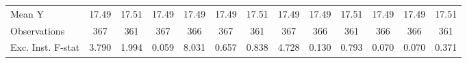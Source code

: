 {\begin{tabular}{l*{12}{c}}
\midrule
Mean Y      &       17.49         &       17.51         &       17.49         &       17.49         &       17.49         &       17.51         &       17.49         &       17.49         &       17.51         &       17.49         &       17.49         &       17.51         \\
Observations&         367         &         361         &         367         &         366         &         367         &         361         &         367         &         366         &         361         &         366         &         366         &         361         \\
Exc. Inst. F-stat&       3.790         &       1.994         &       0.059         &       8.031         &       0.657         &       0.838         &       4.728         &       0.130         &       0.793         &       0.070         &       0.070         &       0.371         \\
\bottomrule
\end{tabular}
}
